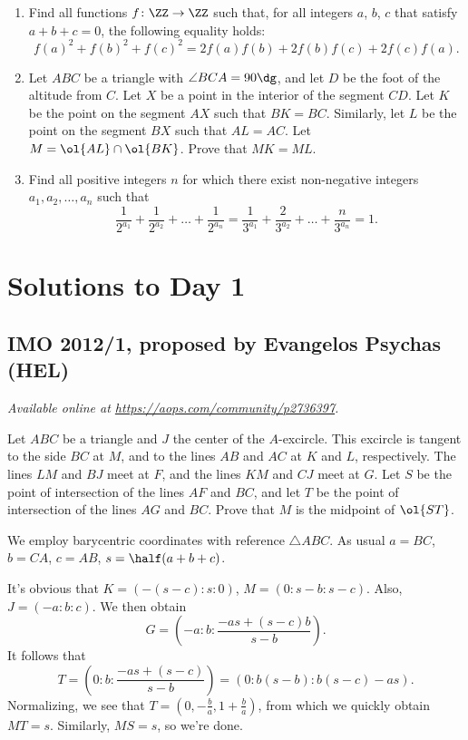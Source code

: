 \documentclass[11pt]{scrartcl}
\begin{document}
\begin{enumerate}[\bfseries 1.]
\item %
Find all functions $f \colon \ZZ \to \ZZ$ such that,
for all integers $a$, $b$, $c$ that satisfy $a+b+c=0$,
the following equality holds:
\[ f(a)^2+f(b)^2+f(c)^2 = 2f(a)f(b)+2f(b)f(c)+2f(c)f(a). \]

\item %
Let $ABC$ be a triangle with $\angle BCA = 90\dg$,
and let $D$ be the foot of the altitude from $C$.
Let $X$ be a point in the interior of the segment $CD$.
Let $K$ be the point on the segment $AX$ such that $BK = BC$.
Similarly, let $L$ be the point on the segment $BX$ such that $AL = AC$.
Let $M = \ol{AL} \cap \ol{BK}$.
Prove that $MK = ML$.

\item %
Find all positive integers $n$
for which there exist non-negative integers $a_1, a_2, \dots, a_n$
such that
\[ \frac{1}{2^{a_1}} + \frac{1}{2^{a_2}} + \dots + \frac{1}{2^{a_n}}
  = \frac{1}{3^{a_1}} + \frac{2}{3^{a_2}} + \dots + \frac{n}{3^{a_n}}
  = 1. \]

\end{enumerate}
\pagebreak

\section{Solutions to Day 1}
\subsection{IMO 2012/1, proposed by Evangelos Psychas (HEL)}
\textsl{Available online at \url{https://aops.com/community/p2736397}.}
\begin{mdframed}[style=mdpurplebox,frametitle={Problem statement}]
Let $ABC$ be a triangle and $J$ the center of the $A$-excircle.
This excircle is tangent to the side $BC$ at $M$,
and to the lines $AB$ and $AC$ at $K$ and $L$, respectively.
The lines $LM$ and $BJ$ meet at $F$, and the lines $KM$ and $CJ$ meet at $G$.
Let $S$ be the point of intersection of the lines $AF$ and $BC$,
and let $T$ be the point of intersection of the lines $AG$ and $BC$.
Prove that $M$ is the midpoint of $\ol{ST}$.
\end{mdframed}
We employ barycentric coordinates with reference $\triangle ABC$.
As usual $a = BC$, $b = CA$, $c = AB$, $s = \half(a+b+c)$.

It's obvious that $K = ( -(s-c): s : 0)$, $M = ( 0 : s-b : s-c)$.
Also, $J = (-a : b : c)$.
We then obtain
\[ G = \left( -a: b : \frac{-as + (s-c)b}{s-b} \right). \]
It follows that
\[ T = \left( 0 : b : \frac{-as + (s-c)}{s-b} \right) = ( 0 : b(s-b) : b(s-c) - as). \]
Normalizing, we see that $T = \left( 0, -\frac{b}{a}, 1 + \frac{b}{a} \right)$,
from which we quickly obtain $MT = s$.
Similarly, $MS = s$, so we're done.
\pagebreak
\end{document}
